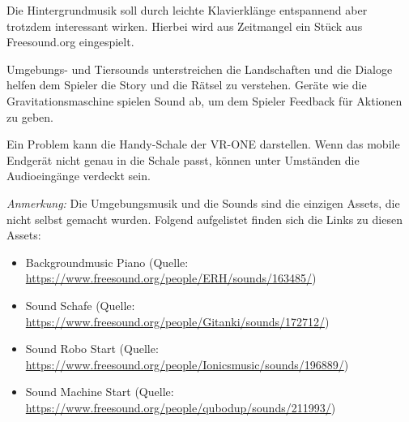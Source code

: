 
Die Hintergrundmusik soll durch leichte Klavierklänge entspannend aber trotzdem interessant wirken. Hierbei wird aus Zeitmangel ein Stück aus Freesound.org eingespielt.

Umgebungs- und Tiersounds unterstreichen die Landschaften und die Dialoge helfen dem Spieler die Story und die Rätsel zu verstehen. Geräte wie die Gravitationsmaschine spielen Sound ab, um dem Spieler Feedback für Aktionen zu geben.

Ein Problem kann die Handy-Schale der VR-ONE darstellen. Wenn das mobile Endgerät nicht genau in die Schale passt, können unter Umständen die Audioeingänge verdeckt sein.

\textit{Anmerkung:} Die Umgebungsmusik und die Sounds sind die einzigen Assets, die nicht selbst gemacht wurden. Folgend aufgelistet finden sich die Links zu diesen Assets:

\begin{itemize}
\item Backgroundmusic Piano (Quelle: \url{https://www.freesound.org/people/ERH/sounds/163485/})
\item Sound Schafe (Quelle: \url{https://www.freesound.org/people/Gitanki/sounds/172712/})
\item Sound Robo Start (Quelle: \url{https://www.freesound.org/people/Ionicsmusic/sounds/196889/})
\item Sound Machine Start (Quelle: \url{https://www.freesound.org/people/qubodup/sounds/211993/})
\end{itemize}
